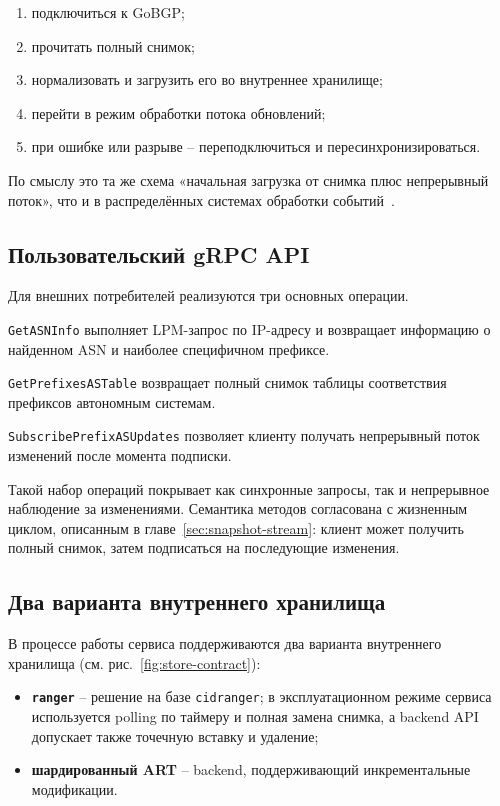 \begin{enumerate}
\item подключиться к GoBGP;
\item прочитать полный снимок;
\item нормализовать и загрузить его во внутреннее хранилище;
\item перейти в режим обработки потока обновлений;
\item при ошибке или разрыве -- переподключиться и пересинхронизироваться.
\end{enumerate}

По смыслу это та же схема «начальная загрузка от снимка плюс
непрерывный поток», что и в распределённых системах обработки
событий~\cite{akidau2015dataflow,carbone2015flink}.

\subsection{Пользовательский gRPC API}

Для внешних потребителей реализуются три основных операции.

\texttt{GetASNInfo} выполняет LPM-запрос по IP-адресу и возвращает
информацию о найденном ASN и наиболее специфичном префиксе.

\texttt{GetPrefixesASTable} возвращает полный снимок таблицы
соответствия префиксов автономным системам.

\texttt{SubscribePrefixASUpdates} позволяет клиенту получать
непрерывный поток изменений после момента подписки.

Такой набор операций покрывает как синхронные запросы, так и непрерывное
наблюдение за изменениями. Семантика методов согласована с жизненным
циклом, описанным в главе~\ref{sec:snapshot-stream}: клиент может
получить полный снимок, затем подписаться на последующие изменения.

\subsection{Два варианта внутреннего хранилища}

В процессе работы сервиса поддерживаются два варианта внутреннего
хранилища
(см. рис.~\ref{fig:store-contract}):

\begin{itemize}
\item \textbf{\texttt{ranger}} -- решение на базе \texttt{cidranger}; в
эксплуатационном режиме сервиса используется polling по таймеру и полная
замена снимка, а backend API допускает также точечную вставку и удаление;
\item \textbf{шардированный ART} -- backend, поддерживающий
инкрементальные модификации.
\end{itemize}

